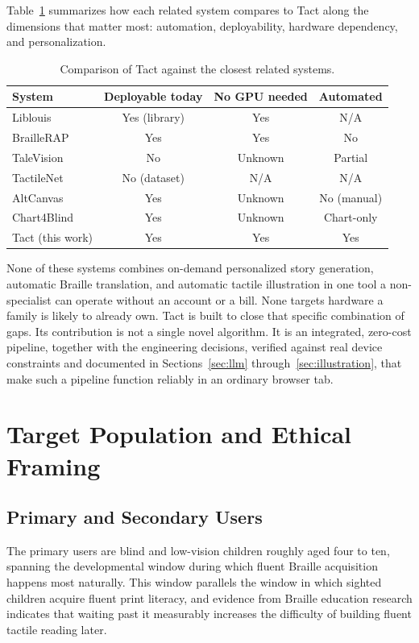 \documentclass[conference]{IEEEtran}
\begin{document}
Table~\ref{tab:relatedwork} summarizes how each related system compares to Tact along the dimensions that matter most: automation, deployability, hardware dependency, and personalization.

\begin{table}[t]
\caption{Comparison of Tact against the closest related systems.}
\label{tab:relatedwork}
\centering
\begin{tabular}{lccc}
\toprule
System & Deployable today & No GPU needed & Automated \\
\midrule
Liblouis \cite{liblouis} & Yes (library) & Yes & N/A \\
BrailleRAP \cite{braillerap} & Yes & Yes & No \\
TaleVision \cite{talevision} & No & Unknown & Partial \\
TactileNet \cite{tactilenet} & No (dataset) & N/A & N/A \\
AltCanvas \cite{altcanvas} & Yes & Unknown & No (manual) \\
Chart4Blind \cite{chart4blind} & Yes & Unknown & Chart-only \\
Tact (this work) & Yes & Yes & Yes \\
\bottomrule
\end{tabular}
\end{table}

None of these systems combines on-demand personalized story generation, automatic Braille translation, and automatic tactile illustration in one tool a non-specialist can operate without an account or a bill. None targets hardware a family is likely to already own. Tact is built to close that specific combination of gaps. Its contribution is not a single novel algorithm. It is an integrated, zero-cost pipeline, together with the engineering decisions, verified against real device constraints and documented in Sections~\ref{sec:llm} through~\ref{sec:illustration}, that make such a pipeline function reliably in an ordinary browser tab.

\section{Target Population and Ethical Framing}\label{sec:population}

\subsection{Primary and Secondary Users}

The primary users are blind and low-vision children roughly aged four to ten, spanning the developmental window during which fluent Braille acquisition happens most naturally. This window parallels the window in which sighted children acquire fluent print literacy, and evidence from Braille education research indicates that waiting past it measurably increases the difficulty of building fluent tactile reading later.
\end{document}
